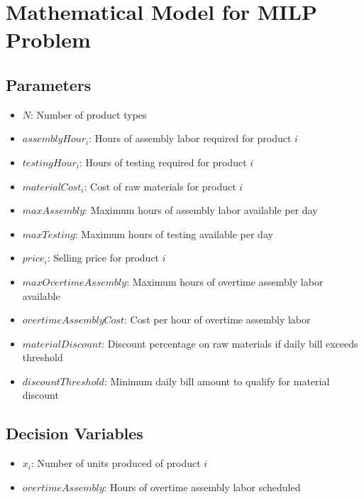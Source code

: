 \documentclass{article}
\begin{document}
\section*{Mathematical Model for MILP Problem}

\subsection*{Parameters}
\begin{itemize}
    \item $N$: Number of product types
    \item $assemblyHour_i$: Hours of assembly labor required for product $i$ \\
    \item $testingHour_i$: Hours of testing required for product $i$ \\
    \item $materialCost_i$: Cost of raw materials for product $i$ \\
    \item $maxAssembly$: Maximum hours of assembly labor available per day \\
    \item $maxTesting$: Maximum hours of testing available per day \\
    \item $price_i$: Selling price for product $i$ \\
    \item $maxOvertimeAssembly$: Maximum hours of overtime assembly labor available \\
    \item $overtimeAssemblyCost$: Cost per hour of overtime assembly labor \\
    \item $materialDiscount$: Discount percentage on raw materials if daily bill exceeds threshold \\
    \item $discountThreshold$: Minimum daily bill amount to qualify for material discount \\
\end{itemize}

\subsection*{Decision Variables}
\begin{itemize}
    \item $x_i$: Number of units produced of product $i$ \\
    \item $overtimeAssembly$: Hours of overtime assembly labor scheduled \\
\end{itemize}
\end{document}

